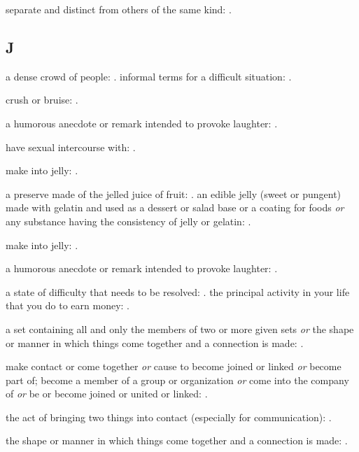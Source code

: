   separate and distinct from others of the same kind: .

\subsection*{J}

  a dense crowd of people: . informal terms for a difficult situation: .

  crush or bruise: .

  a humorous anecdote or remark intended to provoke laughter: .

  have sexual intercourse with: .

  make into jelly: .

  a preserve made of the jelled juice of fruit: . an edible jelly (sweet or pungent) made with gelatin and used as a dessert or salad base or a coating for foods \textit{or} any substance having the consistency of jelly or gelatin: .

  make into jelly: .

  a humorous anecdote or remark intended to provoke laughter: .

  a state of difficulty that needs to be resolved: . the principal activity in your life that you do to earn money: .

  a set containing all and only the members of two or more given sets \textit{or} the shape or manner in which things come together and a connection is made: .

  make contact or come together \textit{or} cause to become joined or linked \textit{or} become part of; become a member of a group or organization \textit{or} come into the company of \textit{or} be or become joined or united or linked: .

  the act of bringing two things into contact (especially for communication): .

  the shape or manner in which things come together and a connection is made: .


